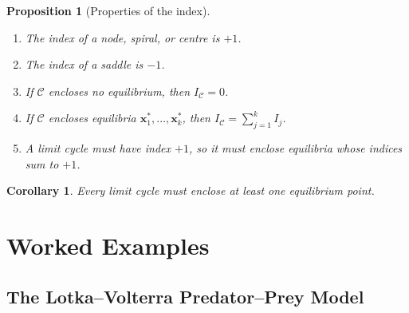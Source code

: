 \documentclass[12pt,a4paper,openany]{book}
\theoremstyle{definition}
\theoremstyle{plain}
\newtheorem{proposition}[definition]{Proposition}
\newtheorem{corollary}[definition]{Corollary}
\theoremstyle{remark}
\begin{document}
\begin{proposition}[Properties of the index]
\label{prop:index-properties}
\begin{enumerate}[label=(\roman*)]
  \item The index of a node, spiral, or centre is $+1$.
  \item The index of a saddle is $-1$.
  \item If $\mathcal{C}$ encloses no equilibrium, then
    $I_{\mathcal{C}}=0$.
  \item If $\mathcal{C}$ encloses equilibria $\mathbf{x}_{1}^{*},
    \dots,\mathbf{x}_{k}^{*}$, then
    $I_{\mathcal{C}}=\sum_{j=1}^{k}I_{j}$.
  \item A limit cycle must have index $+1$, so it must enclose
    equilibria whose indices sum to $+1$.
\end{enumerate}
\end{proposition}

\begin{corollary}
\label{cor:limit-cycle-equilibrium}
Every limit cycle must enclose at least one equilibrium point.
\end{corollary}

\section{Worked Examples}
\label{sec:nonlinear-examples}

\subsection{The Lotka--Volterra Predator--Prey Model}
\label{subsec:lotka-volterra-analysis}
\end{document}
